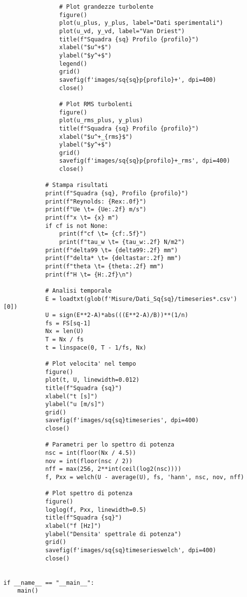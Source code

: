 \begin{lstlisting}
                # Plot grandezze turbolente
                figure()
                plot(u_plus, y_plus, label="Dati sperimentali")
                plot(u_vd, y_vd, label="Van Driest")
                title(f"Squadra {sq} Profilo {profilo}")
                xlabel("$u^+$")
                ylabel("$y^+$")
                legend()
                grid()
                savefig(f'images/sq{sq}p{profilo}+', dpi=400)
                close()

                # Plot RMS turbolenti
                figure()
                plot(u_rms_plus, y_plus)
                title(f"Squadra {sq} Profilo {profilo}")
                xlabel("$u^+_{rms}$")
                ylabel("$y^+$")
                grid()
                savefig(f'images/sq{sq}p{profilo}+_rms', dpi=400)
                close()

            # Stampa risultati
            print(f"Squadra {sq}, Profilo {profilo}")
            print(f"Reynolds: {Rex:.0f}")
            print(f"Ue \t= {Ue:.2f} m/s")
            print(f"x \t= {x} m")
            if cf is not None:
                print(f"cf \t= {cf:.5f}")
                print(f"tau_w \t= {tau_w:.2f} N/m2")
            print(f"delta99 \t= {delta99:.2f} mm")
            print(f"delta* \t= {deltastar:.2f} mm")
            print(f"theta \t= {theta:.2f} mm")
            print(f"H \t= {H:.2f}\n")

            # Analisi temporale
            E = loadtxt(glob(f'Misure/Dati_Sq{sq}/timeseries*.csv')[0])
            U = sign(E**2-A)*abs(((E**2-A)/B))**(1/n)
            fs = FS[sq-1]
            Nx = len(U)
            T = Nx / fs
            t = linspace(0, T - 1/fs, Nx)

            # Plot velocita' nel tempo
            figure()
            plot(t, U, linewidth=0.012)
            title(f"Squadra {sq}")
            xlabel("t [s]")
            ylabel("u [m/s]")
            grid()
            savefig(f'images/sq{sq}timeseries', dpi=400)
            close()
            
            # Parametri per lo spettro di potenza
            nsc = int(floor(Nx / 4.5))
            nov = int(floor(nsc / 2))
            nff = max(256, 2**int(ceil(log2(nsc))))
            f, Pxx = welch(U - average(U), fs, 'hann', nsc, nov, nff)

            # Plot spettro di potenza
            figure()
            loglog(f, Pxx, linewidth=0.5)
            title(f"Squadra {sq}")
            xlabel("f [Hz]")
            ylabel("Densita' spettrale di potenza")
            grid()
            savefig(f'images/sq{sq}timeserieswelch', dpi=400)
            close()


if __name__ == "__main__":
    main()
\end{lstlisting}

